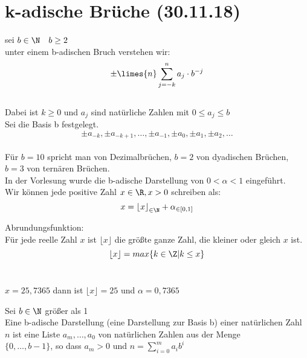 \documentclass[12pt,a4paper,titlepage,draft]{article}
\begin{document}
	\section{k-adische Brüche (30.11.18)}
	\begin{bsp}
		sei \(b \in \N \quad b \geq 2\)\\
		unter einem b-adischen Bruch verstehen wir:\\
		\[\pm \limes{n} \sum_{j=-k}^{n} a_j \cdot b^{-j}\]\\
		Dabei ist \(k \geq 0\) und \(a_j\) sind natürliche Zahlen mit \(0 \leq a_j \leq b\)\\
		Sei die Basis b festgelegt.\\
		\[\pm a_{-k}, \pm a_{-k+1}, \dots ,\pm a_{-1}, \pm a_0, \pm a_1, \pm a_2, \dots\]\\
		Für \(b = 10\) spricht man von Dezimalbrüchen, \(b = 2\) von dyadischen Brüchen, \(b = 3\) von ternären Brüchen.\\
		In der Vorlesung wurde die b-adische Darstellung von \(0 < \alpha < 1\) eingeführt. \\
		Wir können jede positive Zahl \(x \in \R, x > 0\) schreiben als:\\
		\[x = {\lfloor x \rfloor}_{\in \N} + \alpha_{\in [0, 1]} \]
	\end{bsp}
	\begin{defi}
		Abrundungsfunktion:\\
		Für jede reelle Zahl \(x\) ist \(\lfloor x \rfloor\) die größte ganze Zahl, die kleiner oder gleich \(x\) ist.\\
		\[\lfloor x \rfloor = max\{k \in \Z | k \leq x\}\]\\
		\begin{bsp}
			\(x = 25,7365\) dann ist \(\lfloor x \rfloor = 25\) und \(\alpha = 0,7365\)\\
		\end{bsp}
	\end{defi}
	\begin{defi}
		Sei \(b \in \N\) größer als 1\\
		Eine b-adische Darstellung (eine Darstellung zur Basis b) einer natürlichen Zahl \(n\) ist eine Liste \(a_m, \dots, a_0\) von natürlichen Zahlen aus der Menge\\
		\(\{0, \dots, b-1\}\), so dass \(a_m > 0\) und \(n = \sum_{i=0}^{m} a_ib^i\)
	\end{defi}
\end{document}
